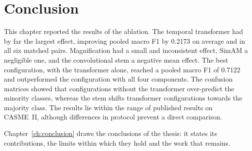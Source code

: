 \section{Conclusion}
\label{sec:ch5-conclusion}

This chapter reported the results of the ablation. The temporal transformer had by far the largest effect, improving pooled macro F1 by 0.2173 on average and in all six matched pairs. Magnification had a small and inconsistent effect, SimAM a negligible one, and the convolutional stem a negative mean effect. The best configuration, with the transformer alone, reached a pooled macro F1 of 0.7122 and outperformed the configuration with all four components. The confusion matrices showed that configurations without the transformer over-predict the minority classes, whereas the stem shifts transformer configurations towards the majority class. The results lie within the range of published results on CASME~II, although differences in protocol prevent a direct comparison.

Chapter~\ref{ch:conclusion} draws the conclusions of the thesis: it states its contributions, the limits within which they hold and the work that remains.
